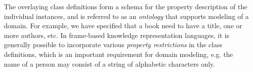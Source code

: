  
The overlaying class definitions form a schema for the property description of the individual instances, and is referred to
as an {\em ontology} that supports modeling of a domain. For example, we have specified that a book
need to have a title, one or more authors, etc. In frame-based knowledge representation languages, it is generally possible 
to incorporate various {\em property restrictions} in the class definitions, which is an important requirement for domain modeling,
e.g. the name of a person may consist of a string of alphabetic characters only. 

